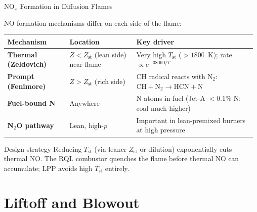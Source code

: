 \documentclass[12pt,aspectratio=169]{beamer}
\newcommand{\Zst}{Z_{\text{st}}}
\begin{document}
\begin{frame}{NO$_x$ Formation in Diffusion Flames}

  NO formation mechanisms differ on each side of the flame:

  \vspace{3pt}
  \begin{center}
  \renewcommand{\arraystretch}{1.35}
  \begin{tabular}{>{\bfseries}p{2.8cm} p{4.3cm} p{4.5cm}}
    \toprule
    Mechanism & Location & Key driver \\
    \midrule
    Thermal (Zeldovich) & $Z < \Zst$ (lean side) near flame &
      Very high $T_{\text{st}}$ ($> 1800$~K);
      rate $\propto e^{-38000/T}$ \\
    Prompt (Fenimore) & $Z > \Zst$ (rich side) &
      CH radical reacts with N$_2$:
      $\text{CH} + \text{N}_2 \to \text{HCN} + \text{N}$ \\
    Fuel-bound N & Anywhere & N atoms in fuel (Jet-A
      $< 0.1$\% N; coal much higher) \\
    N$_2$O pathway & Lean, high-$p$ & Important in
      lean-premixed burners at high pressure \\
    \bottomrule
  \end{tabular}
  \end{center}

  \begin{block}{Design strategy}
    Reducing $T_{\text{st}}$ (via leaner $\Zst$ or dilution)
    exponentially cuts thermal NO.
    The RQL combustor quenches the flame before thermal NO
    can accumulate; LPP avoids high $T_{\text{st}}$ entirely.
  \end{block}
\end{frame}

\section{Liftoff and Blowout}
\end{document}
